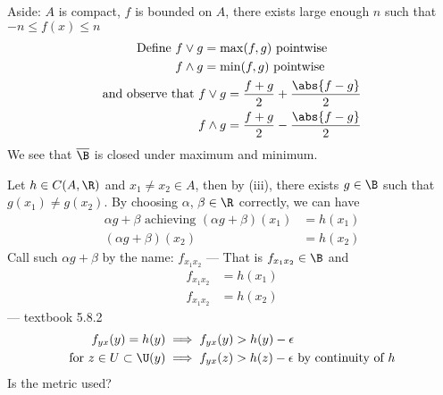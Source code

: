Aside: $A$ is compact, $f$ is bounded on $A$, there exists large enough $n$ such that $-n\leq f(x)\leq n$
\begin{gather*}
\begin{aligned}
\text{Define } f\vee g &= \max(f,g) \text{ pointwise} \\
f\wedge g &= \min(f,g) \text{ pointwise}
\end{aligned}\\
\begin{aligned}
\text{and observe that } f\vee g &= \frac{f+g}{2} + \frac{\abs{f-g}}{2} \\
f\wedge g &= \frac{f+g}{2} - \frac{\abs{f-g}}{2}
\end{aligned}\end{gather*}%
We see that $\overline\B$ is closed under maximum and minimum.

Let $h\in C(A,\R)$ and $x_1\neq x_2\in A$, then by (iii), there exists $g\in\B$ such that $g(x_1)\neq g(x_2)$.  By choosing $\alpha$, $\beta\in\R$ correctly, we can have
\begin{align*}
\alpha g + \beta \text{ achieving } (\alpha g+\beta)(x_1) &= h(x_1) \\
                                    (\alpha g+\beta)(x_2) &= h(x_2)
\end{align*}
Call such $\alpha g+\beta$ by the name: $f_{x_1x_2}$ --- That is $f_{x_1x_2}\in\B$ and
\begin{align*}
f_{x_1x_2} &= h(x_1) \\
f_{x_1x_2} &= h(x_2)
\end{align*}
--- textbook 5.8.2
\begin{align*}
f_{yx}(y) = h(y) &\implies f_{yx}(y) > h(y) - \epsilon \\
\text{for } z\in U\subset\U(y) &\implies f_{yx}(z) > h(z) - \epsilon \text{ by continuity of $h$}
\end{align*}\vspace{-2\baselineskip}\vspace{2\baselineskip}
%
Is the metric used?
